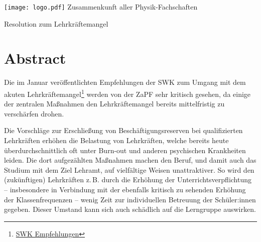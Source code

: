 \documentclass[DIV=calc]{scrartcl}
\let\oldgrqq=\grqq
\def\grqq{\oldgrqq\xspace}
\begin{document}
\hspace{0.87\textwidth}
\begin{minipage}{120pt}
	\vspace{-1.8cm}
	\texttt{[image: logo.pdf]}
	\centering
	\small Zusammenkunft aller Physik-Fachschaften
\end{minipage}

\begin{center}
  \huge{Resolution zum Lehrkräftemangel}\vspace{.25\baselineskip}\\
  \normalsize
\end{center}
\vspace{1cm}







\section*{Abstract}
Die im Januar veröffentlichten Empfehlungen der SWK zum Umgang mit dem akuten Lehrkräftemangel\footnote{\href{https://www.kmk.org/fileadmin/Dateien/pdf/KMK/SWK/2023/SWK-2023-Stellungnahme_Lehrkraeftemangel.pdf}{SWK Empfehlungen}} werden von der ZaPF sehr kritisch gesehen, da einige der zentralen Maßnahmen den Lehrkräftemangel bereits mittelfristig zu verschärfen drohen.

Die Vorschläge zur \glqq Erschließung von Beschäftigungsreserven bei qualifizierten Lehrkräften\grqq erhöhen die Belastung von Lehrkräften, welche bereits heute überdurchschnittlich oft unter Burn-out und anderen psychischen Krankheiten leiden. Die dort aufgezählten Maßnahmen machen den Beruf, und damit auch das Studium mit dem Ziel Lehramt, auf vielfältige Weisen unattraktiver. %
So wird den (zukünftigen) Lehrkräften z.\,B. durch die Erhöhung der Unterrichtsverpflichtung -- insbesondere in Verbindung mit der ebenfalls kritisch zu sehenden Erhöhung der Klassenfrequenzen -- wenig Zeit zur individuellen Betreuung der Schüler:innen gegeben.
Dieser Umstand kann sich auch schädlich auf die Lerngruppe auswirken. 
\end{document}
